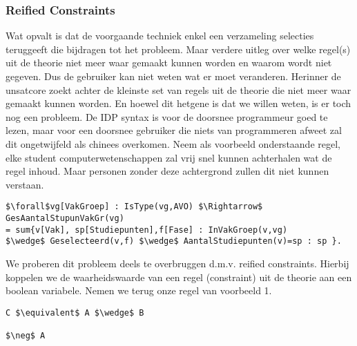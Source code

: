 \subsubsection{Reified Constraints}
Wat opvalt is dat de voorgaande techniek enkel een verzameling selecties teruggeeft die bijdragen tot het probleem. Maar verdere uitleg over welke regel(s) uit de theorie niet meer waar gemaakt kunnen worden en waarom wordt niet gegeven. Dus de gebruiker kan niet weten wat er moet veranderen. 
Herinner de unsatcore zoekt achter de kleinste set van regels uit de theorie die niet meer waar gemaakt kunnen worden. En hoewel dit hetgene is dat we willen weten, is er toch nog een probleem. 
De IDP syntax is voor de doorsnee programmeur goed te lezen, maar voor een doorsnee gebruiker die niets van programmeren afweet zal dit ongetwijfeld als chinees overkomen. Neem als voorbeeld onderstaande regel, elke student computerwetenschappen zal vrij snel kunnen achterhalen wat de regel inhoud. Maar personen zonder deze achtergrond zullen dit niet kunnen verstaan.

\begin{lstlisting}[mathescape]
$\forall$vg[VakGroep] : IsType(vg,AVO) $\Rightarrow$ GesAantalStupunVakGr(vg) 
= sum{v[Vak], sp[Studiepunten],f[Fase] : InVakGroep(v,vg) 
$\wedge$ Geselecteerd(v,f) $\wedge$ AantalStudiepunten(v)=sp : sp }.
\end{lstlisting}

We proberen dit probleem deels te overbruggen d.m.v. reified constraints. Hierbij koppelen we de waarheidswaarde van een regel (constraint) uit de theorie aan een boolean variabele. Nemen we terug onze regel van voorbeeld 1.
\begin{lstlisting}[mathescape]
C $\equivalent$ A $\wedge$ B

$\neg$ A
\end{lstlisting}


